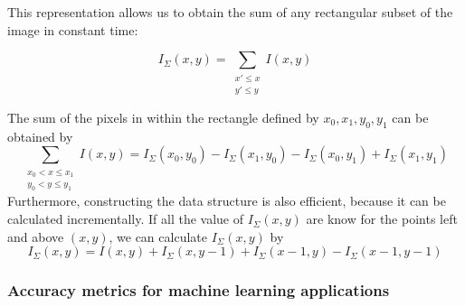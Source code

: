 

This representation allows us to obtain the sum of any rectangular subset
of the image in constant time:

\begin{equation}
I_\Sigma (x,y) =   \sum_{\substack{x' \leq x \\ y' \leq y}}I(x,y)
\end{equation}

The sum of the pixels in within the rectangle defined by $x_0,x_1,y_0,y_1$ can be obtained by
\begin{equation}
\sum_{\substack{ x_0 < x \leq x_1\\ y_0 < y \leq y_1} }I(x,y) = I_\Sigma(x_0,y_0) - I_\Sigma(x_1,y_0)-I_\Sigma(x_0,y_1)+I_\Sigma(x_1,y_1)
\end{equation}
Furthermore, constructing the data structure is also efficient, because it can be calculated incrementally. If
all the value of $I_\Sigma(x,y)$ are know for the points left and above $(x,y)$, we can
calculate $I_\Sigma(x,y)$ by
\begin{equation}
I_\Sigma (x,y) = I(x,y) + I_\Sigma (x,y-1)+I_\Sigma (x-1,y)-I_\Sigma (x-1,y-1)
\end{equation}


\subsubsection{Accuracy metrics for machine learning applications}


